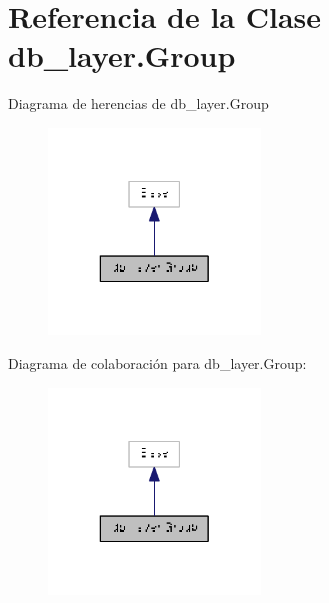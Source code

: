 \hypertarget{classdb__layer_1_1_group}{\section{Referencia de la Clase db\-\_\-layer.\-Group}
\label{classdb__layer_1_1_group}
}


Diagrama de herencias de db\-\_\-layer.\-Group\nopagebreak
\begin{figure}[H]
\begin{center}
\leavevmode
\includegraphics[width=160pt]{classdb__layer_1_1_group__inherit__graph}
\end{center}
\end{figure}


Diagrama de colaboración para db\-\_\-layer.\-Group\-:\nopagebreak
\begin{figure}[H]
\begin{center}
\leavevmode
\includegraphics[width=160pt]{classdb__layer_1_1_group__coll__graph}
\end{center}
\end{figure}
